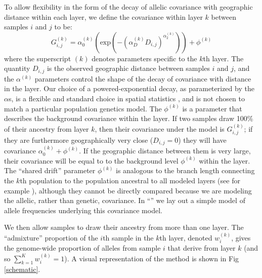 \documentclass[10pt,letterpaper]{article}
\newcommand{\secref}[1]{``\nameref{#1}''}
\begin{document}
To allow flexibility in the form of the decay of allelic covariance with geographic distance within each layer, 
we define the covariance within layer $k$ between samples $i$ and $j$ to be:
\begin{equation}
G^{(k)}_{i,j} 
    = 
    \alpha^{(k)}_0 \left( \text{exp} \left( -(\alpha^{(k)}_D D_{i,j}) ^ {\alpha^{(k)}_2}	\right) \right) + \phi^{(k)}
\label{within_layer_covariance}
\end{equation}
where the superscript $(k)$ denotes parameters specific to the $k$th layer.
The quantity $D_{i,j}$ is the observed geographic distance between samples $i$ and $j$,
and the $\alpha^{(k)}$ parameters control the shape of the decay of
covariance with distance in the layer.
Our choice of a powered-exponential decay, 
as parameterized by the $\alpha$s, 
is a flexible and standard choice in spatial statistics \cite{Diggle1998}, 
and is not chosen to match a particular population genetics model. 
The $\phi^{(k)}$ is a parameter that describes the background covariance within the layer. 
If two samples draw 100\% of their ancestry from layer $k$, then their covariance under the model is $G^{(k)}_{i,j}$;
if they are furthermore geographically very close ($D_{i,j}=0$)
they will have covariance $\alpha^{(k)}_0 +  \phi^{(k)}$.
If the geographic distance between them is very large, 
their covariance will be equal to to the background level $\phi^{(k)}$ within the layer.
The ``shared drift'' parameter $\phi^{(k)}$ is analogous to 
the branch length connecting the $k$th population to the population ancestral to all modeled
layers (see for example \cite{patterson_ancient_2012,peter_fstats}),
although they cannot be directly compared because 
we are modeling the allelic, rather than genetic, covariance. 
In \secref{rationale} we lay out a
simple model of allele frequencies underlying this covariance model.

We then allow samples to draw their ancestry from more than one layer.
The ``admixture'' proportion of the $i$th sample in the $k$th layer, denoted $w^{(k)}_i$,
gives the genome-wide proportion of alleles from sample $i$ that derive from
layer 
$k$ (and so $\sum_{k=1}^K w^{(k)}_i =1$).
A visual representation of the method is shown in Fig \ref{schematic}.
\end{document}
